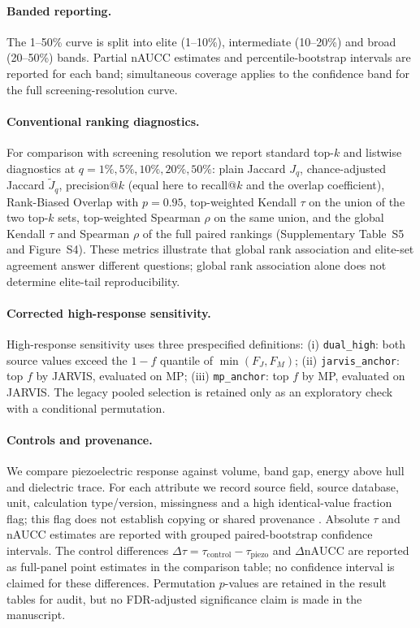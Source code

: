 \documentclass[11pt]{article}
\begin{document}
\paragraph{Banded reporting.}
The 1--50\% curve is split into elite (1--10\%), intermediate (10--20\%) and broad (20--50\%) bands. Partial nAUCC estimates and percentile-bootstrap intervals are reported for each band; simultaneous coverage applies to the confidence band for the full screening-resolution curve.

\paragraph{Conventional ranking diagnostics.}
For comparison with screening resolution we report standard top-$k$ and listwise diagnostics at $q=1\%,5\%,10\%,20\%,50\%$: plain Jaccard $J_q$, chance-adjusted Jaccard $\widetilde J_q$, precision@$k$ (equal here to recall@$k$ and the overlap coefficient), Rank-Biased Overlap with $p=0.95$, top-weighted Kendall $\tau$ on the union of the two top-$k$ sets, top-weighted Spearman $\rho$ on the same union, and the global Kendall $\tau$ and Spearman $\rho$ of the full paired rankings (Supplementary Table~S5 and Figure~S4).
These metrics illustrate that global rank association and elite-set agreement answer different questions; global rank association alone does not determine elite-tail reproducibility.

\paragraph{Corrected high-response sensitivity.}
High-response sensitivity uses three prespecified definitions:
(i) \texttt{dual\_high}: both source values exceed the $1-f$ quantile of $\min(F_J,F_M)$;
(ii) \texttt{jarvis\_anchor}: top $f$ by JARVIS, evaluated on MP;
(iii) \texttt{mp\_anchor}: top $f$ by MP, evaluated on JARVIS.
The legacy pooled selection is retained only as an exploratory check with a conditional permutation.

\paragraph{Controls and provenance.}
We compare piezoelectric response against volume, band gap, energy above hull and dielectric trace.
For each attribute we record source field, source database, unit, calculation type/version, missingness and a high identical-value fraction flag; this flag does not establish copying or shared provenance \cite{wilkinson2016}.
Absolute $\tau$ and nAUCC estimates are reported with grouped paired-bootstrap confidence intervals. The control differences $\Delta\tau = \tau_{\text{control}} - \tau_{\text{piezo}}$ and $\Delta\mathrm{nAUCC}$ are reported as full-panel point estimates in the comparison table; no confidence interval is claimed for these differences. Permutation $p$-values are retained in the result tables for audit, but no FDR-adjusted significance claim is made in the manuscript.
\end{document}
